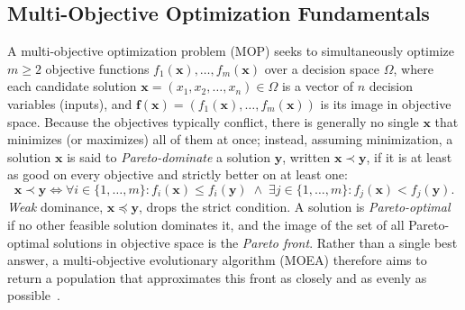 \subsection{Multi-Objective Optimization Fundamentals}
\label{sec:background:moo}

A multi-objective optimization problem (MOP) seeks to simultaneously
optimize $m \geq 2$ objective functions
$f_1(\mathbf{x}), \dots, f_m(\mathbf{x})$ over a decision space
$\Omega$, where each candidate solution $\mathbf{x} = (x_1, x_2, \dots,
x_n) \in \Omega$ is a vector of $n$ decision variables (inputs), and
$\mathbf{f}(\mathbf{x}) = (f_1(\mathbf{x}), \dots, f_m(\mathbf{x}))$ is
its image in objective space. Because the
objectives typically conflict, there is generally no single $\mathbf{x}$ that
minimizes (or maximizes) all of them at once; instead, assuming
minimization, a solution $\mathbf{x}$ is said to \emph{Pareto-dominate}
a solution $\mathbf{y}$, written $\mathbf{x} \prec \mathbf{y}$, if it is at
least as good on every objective and strictly better on at least one:
\begin{equation}
  \mathbf{x} \prec \mathbf{y} \iff
  \forall i \in \{1,\dots,m\}: f_i(\mathbf{x}) \le f_i(\mathbf{y})
  \;\wedge\;
  \exists j \in \{1,\dots,m\}: f_j(\mathbf{x}) < f_j(\mathbf{y}).
\end{equation}
\emph{Weak} dominance, $\mathbf{x} \preceq \mathbf{y}$, drops the strict
condition. A
solution is \emph{Pareto-optimal} if no other feasible solution
dominates it, and the image of the set of all Pareto-optimal solutions
in objective space is the \emph{Pareto front}. Rather than a single best
answer, a multi-objective evolutionary algorithm (MOEA) therefore aims to
return a population that approximates this front as closely and as
evenly as possible~\citep{emmerich2018tutorial}.


